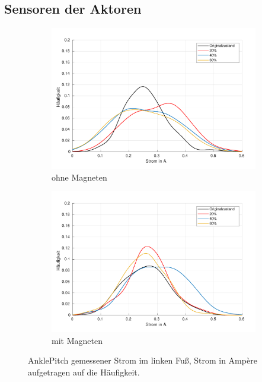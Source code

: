 \FloatBarrier
\subsection{Sensoren der Aktoren}

\begin{figure}[tb]
	\centering
		\begin{subfigure}[c]{.9\linewidth}
			\centering
			\includegraphics[width=\linewidth]{Bilder/links_Current_AnklePitch_ohneM.pdf}
			\caption{ohne Magneten}
		\end{subfigure}
		\begin{subfigure}[c]{.9\linewidth}
			\centering
			\includegraphics[width=\linewidth]{Bilder/links_Current_AnklePitch_mitM.pdf}
			\caption{mit Magneten}
		\end{subfigure}
	\caption{AnklePitch gemessener Strom im linken Fuß, Strom in Ampère aufgetragen auf die Häufigkeit.} \label{AnklePitch_Current_links}
\end{figure}

